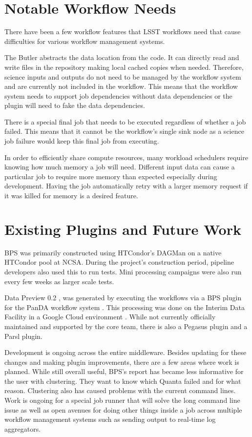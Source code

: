 \documentclass[11pt,twoside]{article}
\begin{document}
\section{Notable Workflow Needs}
There have been a few workflow features that LSST workflows need that
cause difficulties for various workflow management systems.

The Butler abstracts the data location from the code.  It can directly
read and write files in the repository making local cached copies when
needed.  Therefore, science inputs and outputs do not need to be managed
by the workflow system and are currently not included in the workflow.
This means that the workflow system needs to support job dependencies
without data dependencies or the plugin will need to fake the data
dependencies.

There is a special final job that needs to be executed regardless of
whether a job failed.  This means that it cannot be the workflow's
single sink node as a science job failure would keep this final job
from executing.

In order to efficiently share compute resources, many workload schedulers
require knowing how much memory a job will need.  Different input data can
cause a particular job to require more memory than expected especially
during development.  Having the job automatically retry with a larger
memory request if it was killed for memory is a desired feature.

\section{Existing Plugins and Future Work}
BPS was primarily constructed using HTCondor's \citep{10.1002/cpe.938}
DAGMan on a native HTCondor pool at NCSA.  During the project's
construction period, pipeline developers also used this to run tests.
Mini processing campaigns were also run every few weeks as larger
scale tests.

Data Preview 0.2 \citep[DP0.2;][]{RTN-039}, was generated by
executing the workflows via a BPS plugin for the PanDA workflow system
\citep{10.1088/1742-6596/331/7/072024}.  This processing was done on
the Interim Data Facility in a Google Cloud environment \citep{2021arXiv211115030O}.
While not currently officially maintained and supported by the core team,
there is also a Pegasus \citep{10.1016/j.future.2014.10.008} plugin and
a Parsl \citep{10.1145/3307681.3325400} plugin.

Development is ongoing across the entire middleware.  Besides updating for
these changes and making plugin improvements, there are a few areas where
work is planned.  While still overall useful, BPS's report has became less
informative for the user with clustering.  They want to know which Quanta
failed and for what reason.  Clustering also has caused problems with
the current command lines.  Work is ongoing for a special job runner that
will solve the long command line issue as well as open avenues for doing
other things inside a job across multiple workflow management systems such as sending output to real-time log aggregators.
\end{document}
